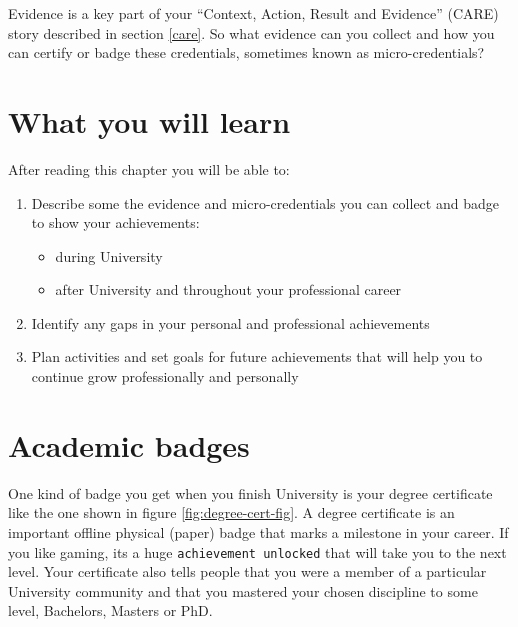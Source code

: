 \documentclass[
]{book}
\providecommand{\tightlist}{%
  \setlength{\itemsep}{0pt}\setlength{\parskip}{0pt}}
\begin{document}
Evidence is a key part of your ``Context, Action, Result and Evidence'' (CARE) story described in section \ref{care}. So what evidence can you collect and how you can certify or badge these credentials, sometimes known as micro-credentials? 📛 \citep{microc}

\hypertarget{ilob}{%
\section{What you will learn}\label{ilob}}

After reading this chapter you will be able to:

\begin{enumerate}
\def\labelenumi{\arabic{enumi}.}
\tightlist
\item
  Describe some the evidence and micro-credentials you can collect and badge to show your achievements:

  \begin{itemize}
  \tightlist
  \item
    during University
  \item
    after University and throughout your professional career
  \end{itemize}
\item
  Identify any gaps in your personal and professional achievements
\item
  Plan activities and set goals for future achievements that will help you to continue grow professionally and personally
\end{enumerate}

\hypertarget{academentia}{%
\section{Academic badges}\label{academentia}}

One kind of badge you get when you finish University is your degree certificate like the one shown in figure \ref{fig:degree-cert-fig}. A degree certificate is an important offline physical (paper) badge that marks a milestone in your career. If you like gaming, its a huge \texttt{achievement\ unlocked} that will take you to the next level. Your certificate also tells people that you were a member of a particular University community and that you mastered your chosen discipline to some level, Bachelors, Masters or PhD.
\end{document}
